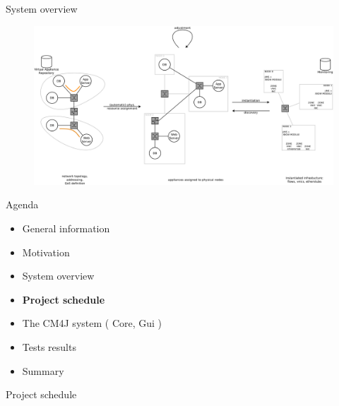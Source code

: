 \documentclass{beamer}
\begin{document}
	\begin{frame}{System overview}
		
		\begin{figure}
		   \includegraphics[width=\textwidth]{img/scope.pdf}
		\end{figure}

	\end{frame}

	\begin{frame}{Agenda}

		\begin{itemize}
			\item General information
			\item Motivation
			\item System overview
			\item \textbf{Project schedule}
			\item The CM4J system ( Core, Gui )
			\item Tests results
			\item Summary
		\end{itemize}

	\end{frame}

	\begin{frame}{Project schedule}


	\end{frame}
\end{document}
